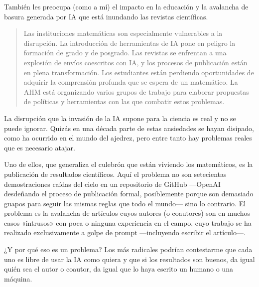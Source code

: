 \documentclass[11pt,a4paper]{article}
\begin{document}
También les preocupa (como a mí) el impacto en la educación y la avalancha de basura generada por IA que está inundando las revistas científicas.

\begin{quotation}
Las instituciones matemáticas son especialmente vulnerables a la disrupción. La introducción de herramientas de IA pone en peligro la formación de grado y de posgrado. Las revistas se enfrentan a una explosión de envíos coescritos con IA, y los procesos de publicación están en plena transformación. Los estudiantes están perdiendo oportunidades de adquirir la comprensión profunda que se espera de un matemático. La AHM está organizando varios grupos de trabajo para elaborar propuestas de políticas y herramientas con las que combatir estos problemas.
\end{quotation}

La disrupción que la invasión de la IA supone para la ciencia es real y no se puede ignorar. Quizás en una década parte de estas ansiedades se hayan disipado, como ha ocurrido en el mundo del ajedrez, pero entre tanto hay problemas reales que es necesario atajar.

Uno de ellos, que generaliza el culebrón que están viviendo los matemáticos, es la publicación de resultados científicos. Aquí el problema no son setecientas demostraciones caídas del cielo en un repositorio de GitHub ---OpenAI desdeñando el proceso de publicación formal, posiblemente porque son demasiado guapos para seguir las mismas reglas que todo el mundo--- sino lo contrario. El problema es la avalancha de artículos cuyos autores (o coautores) son en muchos casos «intrusos» con poca o ninguna experiencia en el campo, cuyo trabajo se ha realizado exclusivamente a golpe de prompt ---incluyendo escribir el artículo---.

¿Y por qué eso es un problema? Los más radicales podrían contestarme que cada uno es libre de usar la IA como quiera y que si los resultados son buenos, da igual quién sea el autor o coautor, da igual que lo haya escrito un humano o una máquina.
\end{document}
